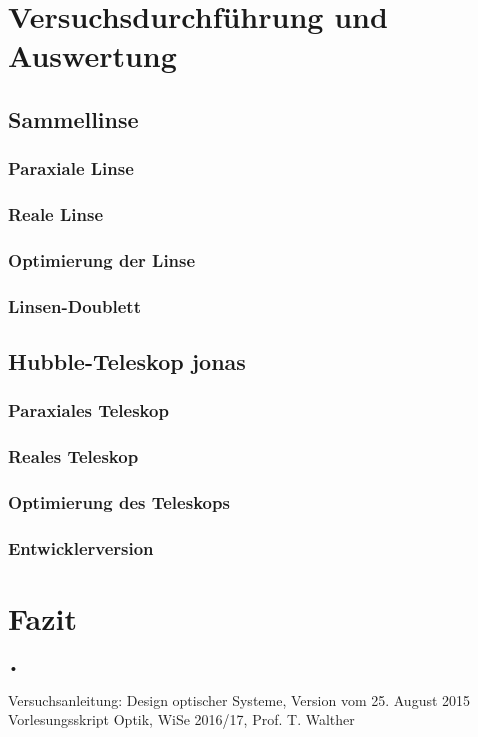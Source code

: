 \documentclass[twoside,colorback,accentcolor=tud4c,11pt]{tudreport}
\begin{document}
\chapter{Versuchsdurchführung und Auswertung}
\section{Sammellinse}
\subsection{Paraxiale Linse}
\subsection{Reale Linse}
\subsection{Optimierung der Linse}
\subsection{Linsen-Doublett}
\section{Hubble-Teleskop jonas}
\subsection{Paraxiales Teleskop}
\subsection{Reales Teleskop}
\subsection{Optimierung des Teleskops}
\subsection{Entwicklerversion}
\chapter{Fazit}	
•
\renewcommand{\bibname}{Literatur}
\begin{thebibliography}{0}
 Versuchsanleitung: Design optischer Systeme, Version vom 25. August 2015
 Vorlesungsskript Optik, WiSe 2016/17, Prof. T. Walther

\end{thebibliography}
\end{document}
